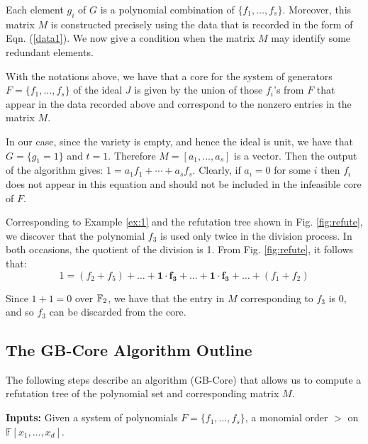 Each element $g_i$ of $G$ is a polynomial combination of $\{f_1, \dots,
f_s\}$. Moreover, this matrix $M$ is constructed precisely using the
data that is recorded in the form of Eqn. (\ref{data1}). We now give a condition
when the matrix $M$ may identify some redundant elements. 


\begin{Theorem}
\label{thm}
With the notations above, we have that a core for the system of
generators $F = \{f_1,\dots,f_s\}$ of the ideal $J$ is given by the
union of those $f_i$'s from $F$ that appear in the data recorded above
and correspond to the nonzero entries in the matrix $M$.  
\end{Theorem}

\begin{Proof}
In our case, since the variety is empty, and hence the ideal is
unit, we have that $G = \{g_1=1\}$ and $t=1$. Therefore $M=
[a_1, \ldots, a_s]$ is a vector. Then the output of the algorithm
gives: $1 = a_1f_1+\cdots + a_s f_s.$ Clearly, if $a_i=0$ for some $i$ then
$f_i$ does not appear in this equation and should not be included in
the infeasible core of $F$. 

\end{Proof}


\begin{Example}

Corresponding to Example \ref{ex:1} and the refutation tree shown in
Fig. \ref{fig:refute}, we discover that the polynomial $f_3$ is used
only twice in the division process. In both occasions, the quotient of
the division is 1. From Fig. \ref{fig:refute}, it follows that:
\begin{equation}
1 = (f_2 + f_5) + \dots + \mathbf{1\cdot f_3} + \dots + \mathbf{1\cdot
  f_3}+ \dots + (f_1 + f_2)
\end{equation}

Since $1 + 1 = 0$ over ${\mathbb{F}}_2$, we have that the entry in $M$
corresponding to $f_3$ is 0, and so $f_3$ can be discarded from the
core. 
\end{Example}

\subsection{The GB-Core Algorithm Outline}

The following steps describe an algorithm (GB-Core) that allows us to compute a
refutation tree of the polynomial set and corresponding matrix $M$. 

{\bf Inputs:} Given a system of polynomials $F=\{f_1,\ldots,f_s\}$, a
monomial order $>$ on $\mathbb{F}[x_1,\ldots,x_d]$.  

